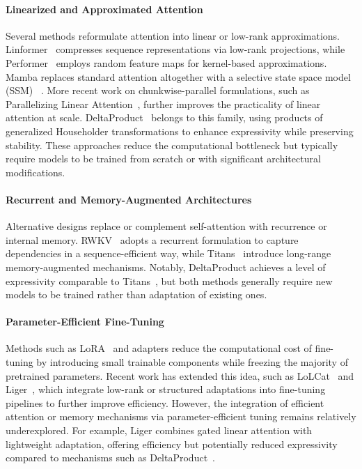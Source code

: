 \documentclass[10pt,a4paper]{article}
\begin{document}
\paragraph{Linearized and Approximated Attention}  
Several methods reformulate attention into linear or low-rank approximations. Linformer~\cite{wang2020linformer} compresses sequence representations via low-rank projections, while Performer~\cite{choromanski2020rethinking} employs random feature maps for kernel-based approximations.  Mamba replaces standard attention altogether with a selective state space model (SSM) ~\cite{dao2024transformers}. More recent work on chunkwise-parallel formulations, such as Parallelizing Linear Attention~\cite{yang2024parallelizing}, further improves the practicality of linear attention at scale. DeltaProduct~\cite{siems2025deltaproduct} belongs to this family, using products of generalized Householder transformations to enhance expressivity while preserving stability. These approaches reduce the computational bottleneck but typically require models to be trained from scratch or with significant architectural modifications.

\paragraph{Recurrent and Memory-Augmented Architectures}  
Alternative designs replace or complement self-attention with recurrence or internal memory. RWKV~\cite{peng2023rwkv} adopts a recurrent formulation to capture dependencies in a sequence-efficient way, while Titans~\cite{behrouz2024titans} introduce long-range memory-augmented mechanisms. Notably, DeltaProduct achieves a level of expressivity comparable to Titans~\cite{behrouz2025s}, but both methods generally require new models to be trained rather than adaptation of existing ones.

\paragraph{Parameter-Efficient Fine-Tuning}  
Methods such as LoRA~\cite{hu2022lora} and adapters reduce the computational cost of fine-tuning by introducing small trainable components while freezing the majority of pretrained parameters. Recent work has extended this idea, such as LoLCat~\cite{zhang2024lolcats} and Liger~\cite{lan2025liger}, which integrate low-rank or structured adaptations into fine-tuning pipelines to further improve efficiency. However, the integration of efficient attention or memory mechanisms via parameter-efficient tuning remains relatively underexplored. For example, Liger combines gated linear attention with lightweight adaptation, offering efficiency but potentially reduced expressivity compared to mechanisms such as DeltaProduct~\cite{siems2025deltaproduct}.
\end{document}
